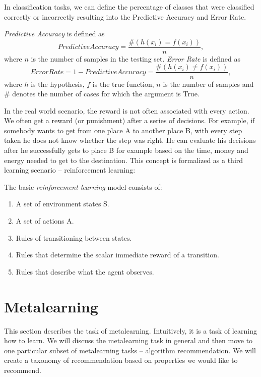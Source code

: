 In classification tasks, we can define the percentage of classes that were classified correctly or incorrectly resulting into the Predictive Accuracy and Error Rate. 

\begin{definition}
	\label{definition:predictiveAccuracy}
	\emph{Predictive Accuracy} is defined as
	\begin{equation*}
	PredictiveAccuracy = \frac{\#(h(x_i)=f(x_i))}{n},
	\end{equation*}
	where $n$ is the number of samples in the testing set.
	\emph{Error Rate} is defined as 
	\begin{equation*}
	ErrorRate = 1 - PredictiveAccuracy = \frac{\#(h(x_i)\ne f(x_i))}{n},
	\end{equation*}
	where $h$ is the hypothesis, $f$ is the true function, $n$ is the number of samples and $\#$ denotes the number of cases for which the argument is True.
\end{definition}

In the real world scenario, the reward is not often associated with every action. We often get a reward (or punishment) after a series of decisions. For example, if somebody wants to get from one place A to another place B, with every step taken he does not know whether the step was right. He can evaluate his decisions after he successfully gets to place B for example based on the time, money and energy needed to get to the destination. This concept is formalized as a third learning scenario -- reinforcement learning:
\begin{definition}
	The basic \emph{reinforcement learning} model consists of:
	\begin{enumerate}
		\item A set of environment states S.
		\item A set of actions A.
		\item Rules of transitioning between states.
		\item Rules that determine the scalar immediate reward of a transition.
		\item Rules that describe what the agent observes.
	\end{enumerate}
\end{definition}

\section{Metalearning}
This section describes the task of metalearning. Intuitively, it is a task of learning how to learn. We will discuss the metalearning task in general and then move to one particular subset of metalearning tasks -- algorithm recommendation. We will create a taxonomy of recommendation based on properties we would like to recommend.

